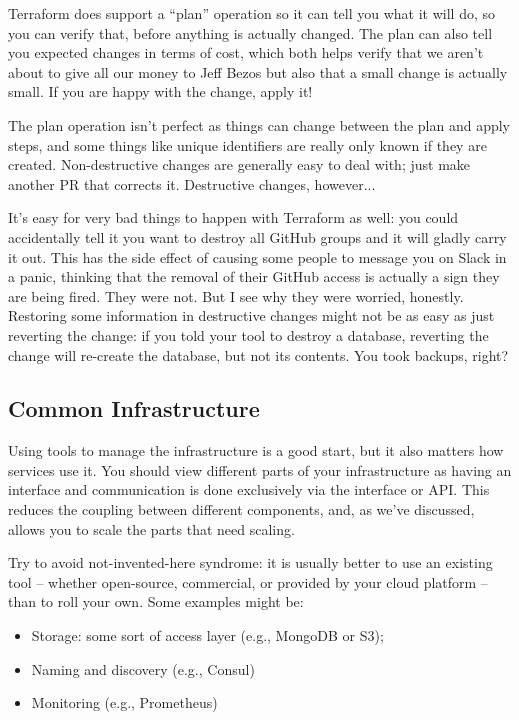 Terraform does support a ``plan'' operation so it can tell you what it will
do, so you can verify that, before anything is actually changed. The plan can also tell you expected changes in terms of cost, which both helps verify that we aren't about to give all our money to Jeff Bezos but also that a small change is actually small. If you are happy with the change, apply it! 

The plan operation isn't perfect as things can change between the plan and apply steps, and some things like unique identifiers are really only known if they are created. Non-destructive changes are generally easy to deal with; just make another PR that corrects it. Destructive changes, however...

It's easy for very bad things to happen with Terraform as well: you could accidentally tell it you want to destroy all GitHub groups and it will gladly carry it out. This has the side effect of causing some people to message you on Slack in a panic, thinking that the removal of their GitHub access is actually a sign they are being fired. They were not. But I see why they were worried, honestly. Restoring some information in destructive changes might not be as easy as just reverting the change: if you told your tool to destroy a database, reverting the change will re-create the database, but not its contents. You took backups, right?

\subsection*{Common Infrastructure}
Using tools to manage the infrastructure is a good start, but it also matters how services use it. You should view different parts of your infrastructure as having an interface and communication is done exclusively via the interface or API. This reduces the coupling between different components, and, as we've discussed, allows you to scale the parts that need scaling. 

Try to avoid not-invented-here syndrome: it is usually better to use an existing tool -- whether open-source, commercial, or provided by your cloud platform -- than to roll your own. Some examples might be:
\begin{itemize}
\item Storage: some sort of access layer (e.g., MongoDB or S3);
\item Naming and discovery (e.g., Consul)
\item Monitoring (e.g., Prometheus)
\end{itemize}


